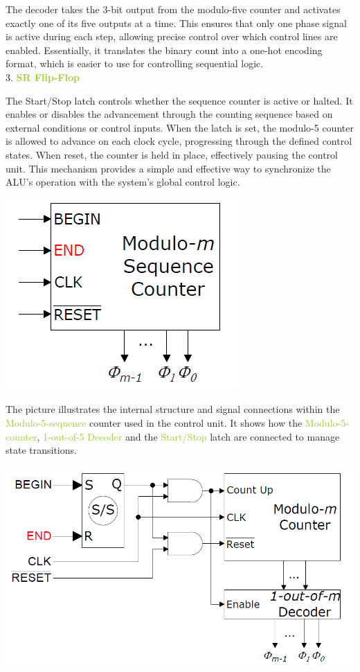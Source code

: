 \documentclass[12pt, letterpaper]{article}
\begin{document}
The decoder takes the 3-bit output from the modulo-five counter and activates exactly one of its five outputs at a time. This ensures that only one phase signal is active during each step, allowing precise control over which
control lines are enabled. Essentially, it translates the binary count into a one-hot encoding format, which is easier to use for controlling sequential logic.\\

3. \textcolor{YellowGreen}{\textbf{SR Flip-Flop}}

The Start/Stop latch controls whether the sequence counter is active or halted. It enables or disables the advancement through the counting sequence based on external conditions or control inputs. When the latch is set, the
modulo-5 counter is allowed to advance on each clock cycle, progressing through the defined control states. When reset, the counter is held in place, effectively pausing the control unit. This mechanism provides a simple and
effective way to synchronize the ALU's operation with the system's global control logic.

\begin{center}
\includegraphics[scale=0.3]{Documentation/modulo_counter}
\end{center}

The picture illustrates the internal structure and signal connections within the \textcolor{YellowGreen}{Modulo-5-sequence} counter used in the control unit.
It shows how the \textcolor{YellowGreen}{Modulo-5-counter}, \textcolor{YellowGreen}{1-out-of-5 Decoder} and the \textcolor{YellowGreen}{Start/Stop} latch are connected to
manage state transitions. 


\begin{center}
\includegraphics[scale=0.3]{Documentation/sr}
\end{center}
\end{document}
